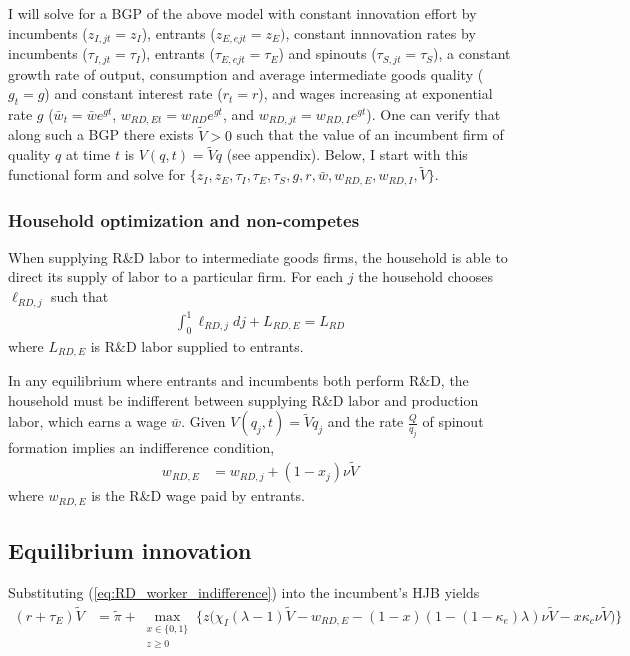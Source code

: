 \documentclass[12pt,english]{article}
\theoremstyle{remark}
\begin{document}
I will solve for a BGP of the above model with constant innovation effort by incumbents ($z_{I,jt} = z_I$), entrants ($z_{E,ejt} = z_{E})$, constant innnovation rates by incumbents ($\tau_{I,jt} = \tau_I$), entrants ($\tau_{E,ejt} = \tau_E$) and spinouts ($\tau_{S,jt} = \tau_S$), a constant growth rate of output, consumption and average intermediate goods quality ($g_t = g$) and constant interest rate ($r_t = r$), and wages increasing at exponential rate $g$ ($\bar{w}_t = \bar{w} e^{gt}$, $w_{RD,Et} = w_{RD}e^{gt}$, and $w_{RD,jt} = w_{RD,I}e^{gt}$). One can verify that along such a BGP there exists $\tilde{V} > 0$ such that the value of an incumbent firm of quality $q$ at time $t$ is $V(q,t) = \tilde{V}q$ (see appendix). Below, I start with this functional form and solve for $\{z_I,z_E,\tau_I,\tau_E,\tau_S,g,r,\bar{w},w_{RD,E},w_{RD,I},\tilde{V}\}$.

\subsubsection{Household optimization and non-competes}

When supplying R\&D labor to intermediate goods firms, the household is able to direct its supply of labor to a particular firm. For each $j$ the household chooses $\ell_{RD,j}$ such that
\begin{align}
\int_0^1 \ell_{RD,j} dj + L_{RD,E} = L_{RD}
\end{align}
where $L_{RD,E}$ is R\&D labor supplied to entrants. 

In any equilibrium where entrants and incumbents both perform R\&D, the household must be indifferent between supplying R\&D labor and production labor, which earns a wage $\bar{w}$. Given $V(q_j,t) = \tilde{V}q_j$ and the rate $\frac{Q}{q_j}$ of spinout formation implies an indifference condition, 
\begin{align}
	w_{RD,E} &= w_{RD,j} + (1-x_j) \nu  \tilde{V} \label{eq:RD_worker_indifference}
\end{align}
where $w_{RD,E}$ is the R\&D wage paid by entrants.


\subsection{Equilibrium innovation}

Substituting (\ref{eq:RD_worker_indifference}) into the incumbent's HJB yields
\begin{align}
	(r + \tau_E) \tilde{V} &= \tilde{\pi} + \max_{\substack{x \in \{0,1\} \\ z \ge 0}} \Big\{z \big(\chi_I (\lambda - 1) \tilde{V} - w_{RD,E} - (1-x) (1 - (1-\kappa_{e})\lambda)\nu \tilde{V} - x \kappa_{c} \nu \tilde{V}\big) \Big\} \label{eq:hjb_incumbent_workerIndiff}
\end{align}
\end{document}
